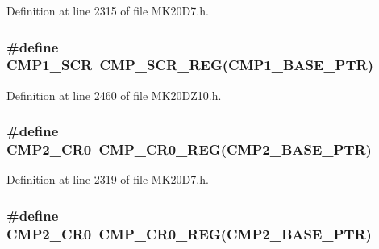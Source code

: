 Definition at line 2315 of file M\+K20\+D7.\+h.

\subsubsection[{\texorpdfstring{C\+M\+P1\+\_\+\+S\+CR}{CMP1_SCR}}]{\setlength{\rightskip}{0pt plus 5cm}\#define C\+M\+P1\+\_\+\+S\+CR~{\bf C\+M\+P\+\_\+\+S\+C\+R\+\_\+\+R\+EG}({\bf C\+M\+P1\+\_\+\+B\+A\+S\+E\+\_\+\+P\+TR})}\hypertarget{group___c_m_p___register___accessor___macros_gaed2f22d532cad1fddbaa508702e09d5e}{}\label{group___c_m_p___register___accessor___macros_gaed2f22d532cad1fddbaa508702e09d5e}


Definition at line 2460 of file M\+K20\+D\+Z10.\+h.

\subsubsection[{\texorpdfstring{C\+M\+P2\+\_\+\+C\+R0}{CMP2_CR0}}]{\setlength{\rightskip}{0pt plus 5cm}\#define C\+M\+P2\+\_\+\+C\+R0~{\bf C\+M\+P\+\_\+\+C\+R0\+\_\+\+R\+EG}({\bf C\+M\+P2\+\_\+\+B\+A\+S\+E\+\_\+\+P\+TR})}\hypertarget{group___c_m_p___register___accessor___macros_ga032f709b685f855d5110183cf53f79ed}{}\label{group___c_m_p___register___accessor___macros_ga032f709b685f855d5110183cf53f79ed}


Definition at line 2319 of file M\+K20\+D7.\+h.

\subsubsection[{\texorpdfstring{C\+M\+P2\+\_\+\+C\+R0}{CMP2_CR0}}]{\setlength{\rightskip}{0pt plus 5cm}\#define C\+M\+P2\+\_\+\+C\+R0~{\bf C\+M\+P\+\_\+\+C\+R0\+\_\+\+R\+EG}({\bf C\+M\+P2\+\_\+\+B\+A\+S\+E\+\_\+\+P\+TR})}\hypertarget{group___c_m_p___register___accessor___macros_ga032f709b685f855d5110183cf53f79ed}{}\label{group___c_m_p___register___accessor___macros_ga032f709b685f855d5110183cf53f79ed}


